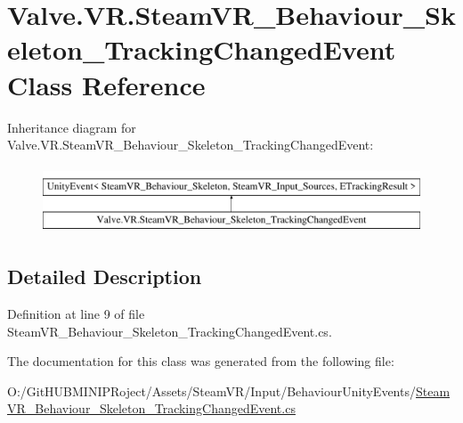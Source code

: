 \hypertarget{class_valve_1_1_v_r_1_1_steam_v_r___behaviour___skeleton___tracking_changed_event}{}\section{Valve.\+V\+R.\+Steam\+V\+R\+\_\+\+Behaviour\+\_\+\+Skeleton\+\_\+\+Tracking\+Changed\+Event Class Reference}
\label{class_valve_1_1_v_r_1_1_steam_v_r___behaviour___skeleton___tracking_changed_event}
Inheritance diagram for Valve.\+V\+R.\+Steam\+V\+R\+\_\+\+Behaviour\+\_\+\+Skeleton\+\_\+\+Tracking\+Changed\+Event\+:\begin{figure}[H]
\begin{center}
\leavevmode
\includegraphics[height=2.000000cm]{class_valve_1_1_v_r_1_1_steam_v_r___behaviour___skeleton___tracking_changed_event}
\end{center}
\end{figure}


\subsection{Detailed Description}


Definition at line 9 of file Steam\+V\+R\+\_\+\+Behaviour\+\_\+\+Skeleton\+\_\+\+Tracking\+Changed\+Event.\+cs.



The documentation for this class was generated from the following file\+:\begin{DoxyCompactItemize}
\item 
O\+:/\+Git\+H\+U\+B\+M\+I\+N\+I\+P\+Roject/\+Assets/\+Steam\+V\+R/\+Input/\+Behaviour\+Unity\+Events/\mbox{\hyperlink{_steam_v_r___behaviour___skeleton___tracking_changed_event_8cs}{Steam\+V\+R\+\_\+\+Behaviour\+\_\+\+Skeleton\+\_\+\+Tracking\+Changed\+Event.\+cs}}\end{DoxyCompactItemize}
